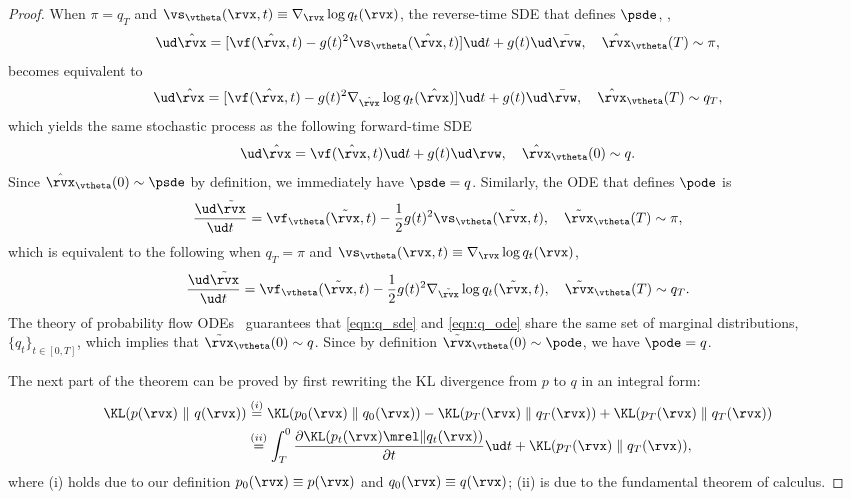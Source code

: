 \thm*
\begin{proof}
When $\pi = q_T$ and $\vs_\vtheta(\rvx, t) \equiv \nabla_\rvx \log q_t(\rvx)$, the reverse-time SDE that defines $\psde$, \ie,
\begin{align}
\ud \hat{\rvx} = [\vf(\hat{\rvx}, t) - g(t)^2 \vs_\vtheta(\hat{\rvx}, t)] \ud t + g(t) \ud \bar{\rvw}, \quad \hat{\rvx}_\vtheta(T) \sim \pi,
\end{align}
becomes equivalent to
\begin{align}
    \ud \hat{\rvx} = [\vf(\hat{\rvx}, t) - g(t)^2 \nabla_{\hat{\rvx}} \log q_t(\hat{\rvx})] \ud t + g(t) \ud \bar{\rvw}, \quad \hat{\rvx}_\vtheta(T) \sim q_T,
\end{align}
which yields the same stochastic process as the following forward-time SDE
\begin{align}
    \ud \hat{\rvx} = \vf(\hat{\rvx}, t) \ud t + g(t) \ud \rvw, \quad \hat{\rvx}_\vtheta(0) \sim q. \label{eqn:q_sde}
\end{align}
Since $\hat{\rvx}_\vtheta(0) \sim \psde$ by definition, we immediately have $\psde = q$. Similarly, the ODE that defines $\pode$ is
\begin{align}
    \frac{\ud \tilde{\rvx}}{\ud t} = \vf_\vtheta(\tilde{\rvx}, t) - \frac{1}{2}g(t)^2 \vs_\vtheta(\tilde{\rvx}, t), \quad \tilde{\rvx}_\vtheta(T) \sim \pi,
\end{align}
which is equivalent to the following when $q_T = \pi$ and $\vs_\vtheta(\rvx, t) \equiv \nabla_\rvx \log q_t(\rvx)$,
\begin{align}
    \frac{\ud \tilde{\rvx}}{\ud t} = \vf_\vtheta(\tilde{\rvx}, t) - \frac{1}{2}g(t)^2 \nabla_{\tilde{\rvx}} \log q_t(\tilde{\rvx}, t), \quad \tilde{\rvx}_\vtheta(T) \sim q_T. \label{eqn:q_ode}
\end{align}
The theory of probability flow ODEs~\cite{song2020score} guarantees that \cref{eqn:q_sde} and \cref{eqn:q_ode} share the same set of marginal distributions, $\{q_t\}_{t\in[0,T]}$, which implies that $\tilde{\rvx}_\vtheta(0) \sim q$. Since by definition $\tilde{\rvx}_\vtheta(0) \sim \pode$, we have $\pode = q$.

The next part of the theorem can be proved by first rewriting the KL divergence from $p$ to $q$ in an integral form:
\begin{align}
    \KL(p(\rvx)~\|~q(\rvx)) &\stackrel{(i)}{=} \KL(p_0(\rvx)\mathrel\| q_0(\rvx)) - \KL(p_T(\rvx)\mathrel\| q_T(\rvx)) + \KL(p_T(\rvx)\mathrel\| q_T(\rvx))\notag \\
    &\stackrel{(ii)}{=} \int_{T}^0 \frac{\partial \KL(p_t(\rvx)\mrel\| q_t(\rvx))}{\partial t} \ud t + \KL(p_T(\rvx)\mathrel\| q_T(\rvx)), \label{eqn:int}
\end{align}
where (i) holds due to our definition $p_0(\rvx) \equiv p(\rvx)$ and $q_0(\rvx) \equiv q(\rvx)$; (ii) is due to the fundamental theorem of calculus.


\end{proof}
